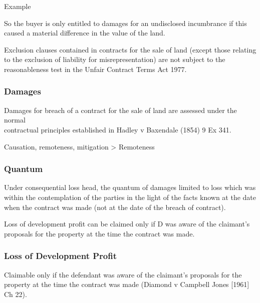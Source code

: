 \documentclass[
]{article}
\newenvironment{env-4d86b145-82dd-4772-a680-deba5516c751}
{
    \savenotes\tcolorbox[blanker,breakable,left=5pt,borderline west={2pt}{-4pt}{purple}]
}
{
    \endtcolorbox\spewnotes
}
\begin{document}
\begin{env-4d86b145-82dd-4772-a680-deba5516c751}

Example

So the buyer is only entitled to damages for an undisclosed incumbrance
if this caused a material difference in the value of the land.

\end{env-4d86b145-82dd-4772-a680-deba5516c751}

Exclusion clauses contained in contracts for the sale of land (except
those relating to the exclusion of liability for misrepresentation) are
not subject to the reasonableness test in the Unfair Contract Terms Act
1977.

\hypertarget{damages}{%
\subsubsection{Damages}\label{damages}}

Damages for breach of a contract for the sale of land are assessed under
the normal\\
contractual principles established in Hadley v Baxendale (1854) 9 Ex
341.

{Causation, remoteness, mitigation \textgreater{} Remoteness}

\hypertarget{quantum}{%
\subsubsection{Quantum}\label{quantum}}

Under consequential loss head, the quantum of damages limited to loss
which was within the contemplation of the parties in the light of the
facts known at the date when the contract was made (not at the date of
the breach of contract).

Loss of development profit can be claimed only if D was aware of the
claimant's proposals for the property at the time the contract was made.

\hypertarget{loss-of-development-profit}{%
\subsubsection{Loss of Development
Profit}\label{loss-of-development-profit}}

Claimable only if the defendant was aware of the claimant's proposals
for the property at the time the contract was made (Diamond v Campbell
Jones {[}1961{]} Ch 22).
\end{document}
